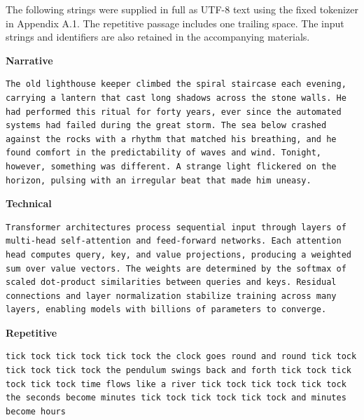 The following strings were supplied in full as UTF-8 text using the fixed tokenizer in Appendix A.1. The repetitive passage includes one trailing space. The input strings and identifiers are also retained in the accompanying materials.


\textbf{Narrative}

\begin{Verbatim}[breaklines=true,breakanywhere=false,breaksymbolleft={},breaksymbolright={},fontsize=\small,frame=single,rulecolor=\color{lightgray},framesep=8pt]
The old lighthouse keeper climbed the spiral staircase each evening, carrying a lantern that cast long shadows across the stone walls. He had performed this ritual for forty years, ever since the automated systems had failed during the great storm. The sea below crashed against the rocks with a rhythm that matched his breathing, and he found comfort in the predictability of waves and wind. Tonight, however, something was different. A strange light flickered on the horizon, pulsing with an irregular beat that made him uneasy.
\end{Verbatim}


\textbf{Technical}

\begin{Verbatim}[breaklines=true,breakanywhere=false,breaksymbolleft={},breaksymbolright={},fontsize=\small,frame=single,rulecolor=\color{lightgray},framesep=8pt]
Transformer architectures process sequential input through layers of multi-head self-attention and feed-forward networks. Each attention head computes query, key, and value projections, producing a weighted sum over value vectors. The weights are determined by the softmax of scaled dot-product similarities between queries and keys. Residual connections and layer normalization stabilize training across many layers, enabling models with billions of parameters to converge.
\end{Verbatim}


\textbf{Repetitive}

\begin{Verbatim}[breaklines=true,breakanywhere=false,breaksymbolleft={},breaksymbolright={},fontsize=\small,frame=single,rulecolor=\color{lightgray},framesep=8pt]
tick tock tick tock tick tock the clock goes round and round tick tock tick tock tick tock the pendulum swings back and forth tick tock tick tock tick tock time flows like a river tick tock tick tock tick tock the seconds become minutes tick tock tick tock tick tock and minutes become hours 
\end{Verbatim}

